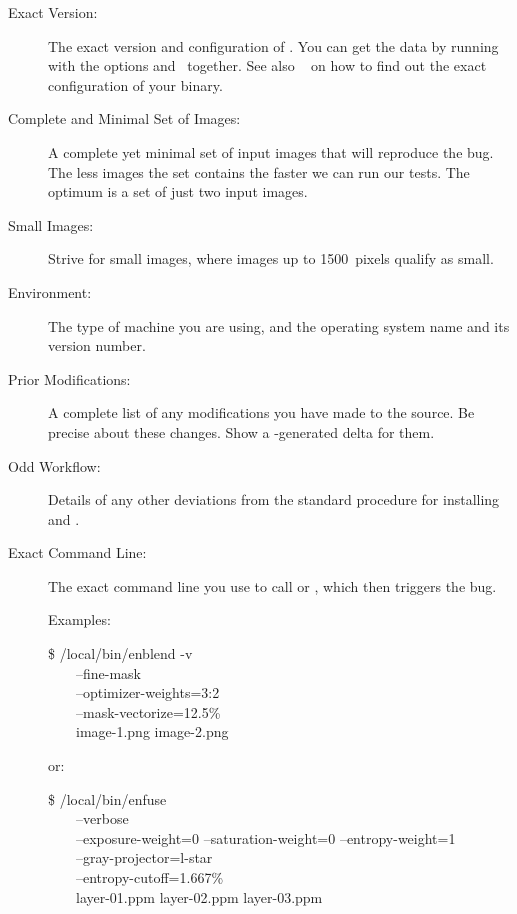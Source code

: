 \begin{description}\renewcommand{\makelabel}[1]{\textbf{#1}}
\item[Exact Version:] The exact version and configuration of \App.  You can get the data by
  running \app{} with the options  and~ together.  See also
  \sectionName~ on how to find out the exact configuration of
  your binary.

\item[Complete and Minimal Set of Images:] A complete yet minimal set of input images that will
  reproduce the bug.  The less images the set contains the faster we can run our tests.  The
  optimum is a set of just two input images.

\item[Small Images:] Strive for small images, where images up to 1500~pixels
  qualify as small.

\item[Environment:] The type of machine you are using, and the operating system name and its
  version number.

\item[Prior Modifications:] A complete list of any modifications you have made to the source.
  Be precise about these changes.  Show a -generated delta for them.

\item[Odd Workflow:] Details of any other deviations from the standard procedure for installing
  \App{} and \OtherApp{}.

\item[Exact Command Line:] The exact command line you use to call \App{} or \OtherApp{}, which
  then triggers the bug.

  Examples:

  \begin{terminal}
    \$ \squiggle/local/bin/enblend -v \bslash \\
    ~~~~--fine-mask \bslash \\
    ~~~~--optimizer-weights=3:2 \bslash \\
    ~~~~--mask-vectorize=12.5\% \bslash \\
    ~~~~image-1.png image-2.png
  \end{terminal}

  or:

  \begin{terminal}
    \$ /local/bin/enfuse \bslash \\
    ~~~~--verbose \bslash \\
    ~~~~--exposure-weight=0 --saturation-weight=0 --entropy-weight=1 \bslash \\
    ~~~~--gray-projector=l-star \bslash \\
    ~~~~--entropy-cutoff=1.667\% \bslash \\
    ~~~~layer-01.ppm layer-02.ppm layer-03.ppm
  \end{terminal}


\end{description}
